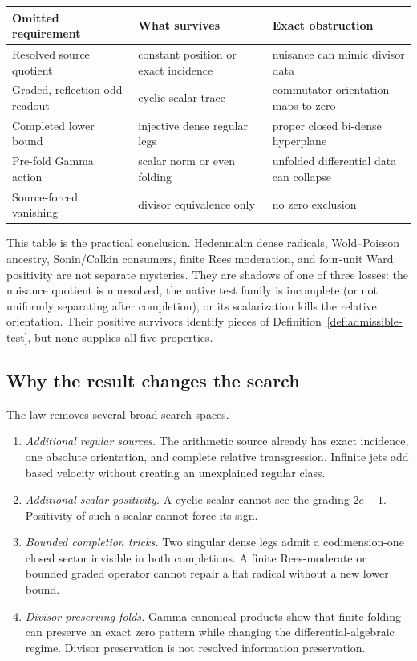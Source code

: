\documentclass[11pt]{article}
\theoremstyle{definition}
\theoremstyle{remark}
\begin{document}
\begin{center}
\begin{tabularx}{\textwidth}{@{}>{\raggedright\arraybackslash}p{}
  >{\raggedright\arraybackslash}X
  >{\raggedright\arraybackslash}p{}@{}}
\toprule
Omitted requirement & What survives & Exact obstruction \\
\midrule
Resolved source quotient & constant position or exact incidence & nuisance can mimic divisor data \\
Graded, reflection-odd readout & cyclic scalar trace & commutator orientation maps to zero \\
Completed lower bound & injective dense regular legs & proper closed bi-dense hyperplane \\
Pre-fold Gamma action & scalar norm or even folding & unfolded differential data can collapse \\
Source-forced vanishing & divisor equivalence only & no zero exclusion \\
\bottomrule
\end{tabularx}
\end{center}

This table is the practical conclusion.  Hedenmalm dense radicals,
Wold--Poisson ancestry, Sonin/Calkin consumers, finite Rees moderation, and
four-unit Ward positivity are not separate mysteries.  They are shadows of
one of three losses: the nuisance quotient is unresolved, the native test
family is incomplete (or not uniformly separating after completion), or its
scalarization kills the relative orientation.  Their
positive survivors identify pieces of Definition~\ref{def:admissible-test},
but none supplies all five properties.

\subsection{Why the result changes the search}

The law removes several broad search spaces.

\begin{enumerate}[leftmargin=2.1em]
\item \emph{Additional regular sources.}  The arithmetic source already has
      exact incidence, one absolute orientation, and complete relative
      transgression.  Infinite jets add based velocity without creating an
      unexplained regular class.
\item \emph{Additional scalar positivity.}  A cyclic scalar cannot see the
      grading \(2e-1\).  Positivity of such a scalar cannot force its sign.
\item \emph{Bounded completion tricks.}  Two singular dense legs admit a
      codimension-one closed sector invisible in both completions.  A finite
      Rees-moderate or bounded graded operator cannot repair a flat radical
      without a new lower bound.
\item \emph{Divisor-preserving folds.}  Gamma canonical products show that
      finite folding can preserve an exact zero pattern while changing the
      differential-algebraic regime.  Divisor preservation is not resolved
      information preservation.
\end{enumerate}
\end{document}
